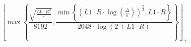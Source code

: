 \[\left\lfloor \max\left\{ \frac{\sqrt{\frac{L0 \cdot R^{2}}{\varepsilon}}}{8192}, \frac{\min\left\{ \left(L1 \cdot R \cdot \log\left(\frac{\Delta}{\varepsilon}\right)\right)^{\frac{2}{3}}, L1 \cdot R \right\}}{2048 \cdot \log\left(2 + L1 \cdot R\right)} \right\} \right\rfloor_{+}\]
